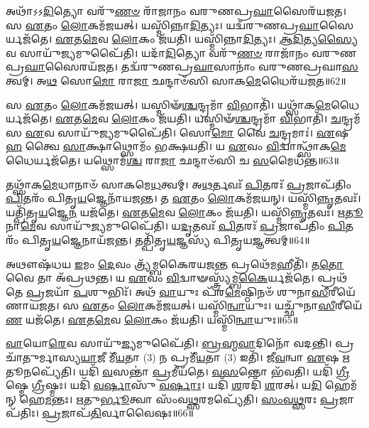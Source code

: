 𑌅𑌥𑌾᳴𑌽𑌽\-\ul{𑌦𑌿}\-𑌤𑍍𑌯𑍋 𑌵𑌰𑍁᳴\-\ul{𑌣}\-\-\ul{𑍞} 𑌰𑌾᳴𑌜𑌾𑌨𑌂 𑌵𑌰𑍁𑌣𑌪𑍍𑌰\-\ul{𑌘𑌾}\-𑌸𑍈𑌰᳴𑌯𑌜𑌤।
𑌸 \ul{𑌏}\-𑌤𑌂 \ul{𑌲𑍋}\-𑌕𑌮᳴𑌜𑌯𑌤𑍍।
𑌯𑌸𑍍𑌮𑌿᳴𑌨𑍍𑌨𑌾\-\ul{𑌦𑌿}\-𑌤𑍍𑌯𑌃।
𑌯𑌦𑍍𑌵᳴𑌰𑍁𑌣𑌪𑍍𑌰\-\ul{𑌘𑌾}\-𑌸𑍈𑌰𑍍𑌯𑌜᳴𑌤𑍇।
\-\ul{𑌏}\-𑌤\-\ul{𑌮𑍇}\-𑌵 \ul{𑌲𑍋}\-𑌕𑌂 𑌜᳴𑌯𑌤𑌿।
𑌯𑌸𑍍𑌮𑌿᳴𑌨𑍍𑌨𑌾\-\ul{𑌦𑌿}\-𑌤𑍍𑌯𑌃।
\-\ul{𑌆}\-\-\ul{𑌦𑌿}\-𑌤𑍍𑌯\-\ul{𑌸𑍍𑌯𑍈}\-𑌵 𑌸𑌾𑌯𑍁᳴\-\ul{𑌜𑍍𑌯}\-𑌮𑍁𑌪𑍈᳴𑌤𑌿।
𑌯𑌦𑌾᳴\-\ul{𑌦𑌿}\-𑌤𑍍𑌯𑍋 𑌵𑌰𑍁᳴\-\ul{𑌣}\-\-\ul{𑍞} 𑌰𑌾𑌜𑌾᳴𑌨𑌂 𑌵𑌰𑍁𑌣𑌪𑍍𑌰\-\ul{𑌘𑌾}\-𑌸𑍈\-𑌰𑌯᳴𑌜𑌤।
𑌤𑌦𑍍𑌵᳴𑌰𑍁𑌣𑌪𑍍𑌰\-\ul{𑌘𑌾}\-𑌸𑌾𑌨𑌾𑌂॑ 𑌵𑌰𑍁𑌣𑌪𑍍𑌰𑌘𑌾\-\ul{𑌸}\-𑌤𑍍𑌵𑌮𑍍।
𑌅\-\ul{𑌥} 𑌸𑍋\-\ul{𑌮𑍋} 𑌰𑌾\-\ul{𑌜𑌾} 𑌛𑌨𑍍𑌦𑌾𑍞᳴𑌸𑌿 𑌸𑌾𑌕\-\ul{𑌮𑍇}\-𑌧𑍈𑌰᳴𑌯𑌜𑌤॥62॥

𑌸 \ul{𑌏}\-𑌤𑌂 \ul{𑌲𑍋}\-𑌕𑌮᳴𑌜𑌯𑌤𑍍।
𑌯𑌸𑍍𑌮𑌿𑍟᳴\-\ul{𑌶𑍍𑌚}\-𑌨𑍍𑌦𑍍𑌰𑌮𑌾᳴ \ul{𑌵𑌿}\-𑌭𑌾𑌤𑌿᳴।
𑌯𑌥𑍍𑌸𑌾᳴𑌕\-\ul{𑌮𑍇}\-𑌧𑍈𑌰𑍍𑌯𑌜᳴𑌤𑍇।
\-\ul{𑌏}\-𑌤\-\ul{𑌮𑍇}\-𑌵 \ul{𑌲𑍋}\-𑌕𑌂 𑌜᳴𑌯𑌤𑌿।
𑌯𑌸𑍍𑌮𑌿𑍟᳴\-\ul{𑌶𑍍𑌚}\-𑌨𑍍𑌦𑍍𑌰𑌮𑌾᳴ \ul{𑌵𑌿}\-𑌭𑌾𑌤𑌿᳴।
\-\ul{𑌚}\-𑌨𑍍𑌦𑍍𑌰𑌮᳴𑌸 \ul{𑌏}\-𑌵 𑌸𑌾𑌯𑍁᳴\-\ul{𑌜𑍍𑌯}\-𑌮𑍁𑌪𑍈᳴𑌤𑌿।
𑌸𑍋\-\ul{𑌮𑍋} 𑌵𑍈 \ul{𑌚}\-𑌨𑍍𑌦𑍍𑌰𑌮𑌾𑌃॑।
\-\ul{𑌏}\-𑌷 \ul{𑌹} 𑌤𑍍𑌵𑍈 \ul{𑌸𑌾}\-𑌕𑍍𑌷𑌾𑌥𑍍𑌸𑍋𑌮𑌂᳴ 𑌭𑌕𑍍𑌷𑌯𑌤𑌿।
𑌯 \ul{𑌏}\-𑌵𑌂 \ul{𑌵𑌿}\-𑌦𑍍𑌵𑌾𑌨𑍍𑌥𑍍𑌸𑌾᳴𑌕\-\ul{𑌮𑍇}\-𑌧𑍈𑌰𑍍𑌯𑌜᳴𑌤𑍇।
𑌯𑌥𑍍𑌸𑍋𑌮᳴\-\ul{𑌶𑍍𑌚} 𑌰𑌾\-\ul{𑌜𑌾} 𑌛𑌨𑍍𑌦𑌾𑍞᳴𑌸𑌿 𑌚 \ul{𑌸}\-𑌮𑍈𑌧᳴𑌨𑍍𑌤॥63॥

𑌤𑌥𑍍𑌸𑌾᳴𑌕\-\ul{𑌮𑍇}\-𑌧𑌾𑌨𑌾𑍞᳴ 𑌸𑌾𑌕𑌮𑍇\-\ul{𑌧}\-𑌤𑍍𑌵𑌮𑍍।
𑌅\-\ul{𑌥}\-𑌰𑍍𑌤𑌵𑌃᳴ \ul{𑌪𑌿}\-𑌤𑌰𑌃᳴ \ul{𑌪𑍍𑌰}\-𑌜𑌾𑌪᳴𑌤𑌿𑌂 \ul{𑌪𑌿}\-𑌤𑌰𑌂᳴ 𑌪𑌿𑌤𑍃\-\ul{𑌯}\-𑌜𑍍𑌞𑍇𑌨𑌾᳴𑌯𑌜𑌨𑍍𑌤।
𑌤 \ul{𑌏}\-𑌤𑌂 \ul{𑌲𑍋}\-𑌕𑌮᳴𑌜𑌯𑌨𑍍।
𑌯𑌸𑍍𑌮𑌿᳴\-\ul{𑌨𑍍𑌨𑍃}\-𑌤𑌵𑌃᳴।
𑌯𑌤𑍍𑌪𑌿᳴𑌤𑍃\-\ul{𑌯}\-𑌜𑍍𑌞𑍇\-\ul{𑌨} 𑌯𑌜᳴𑌤𑍇।
\-\ul{𑌏}\-𑌤\-\ul{𑌮𑍇}\-𑌵 \ul{𑌲𑍋}\-𑌕𑌂 𑌜᳴𑌯𑌤𑌿।
𑌯𑌸𑍍𑌮𑌿᳴\-\ul{𑌨𑍍𑌨𑍃}\-𑌤𑌵𑌃᳴।
\-\ul{𑌋}\-\-\ul{𑌤𑍂}\-𑌨𑌾\-\ul{𑌮𑍇}\-𑌵 𑌸𑌾𑌯𑍁᳴\-\ul{𑌜𑍍𑌯}\-𑌮𑍁𑌪𑍈᳴𑌤𑌿।
𑌯\-\ul{𑌦𑍃}\-𑌤𑌵𑌃᳴ \ul{𑌪𑌿}\-𑌤𑌰𑌃᳴ \ul{𑌪𑍍𑌰}\-𑌜𑌾𑌪᳴𑌤𑌿𑌂 \ul{𑌪𑌿}\-𑌤𑌰𑌂᳴ 𑌪𑌿𑌤𑍃\-\ul{𑌯}\-𑌜𑍍𑌞𑍇𑌨𑌾𑌯᳴𑌜𑌨𑍍𑌤।
𑌤𑌤𑍍𑌪𑌿᳴𑌤𑍃\-\ul{𑌯}\-𑌜𑍍𑌞𑌸𑍍𑌯᳴ 𑌪𑌿𑌤𑍃𑌯\-\ul{𑌜𑍍𑌞}\-𑌤𑍍𑌵𑌮𑍍॥64॥

𑌅𑌥𑍗𑌷᳴𑌧𑌯 \ul{𑌇}\-𑌮𑌂 \ul{𑌦𑍇}\-𑌵𑌂 𑌤𑍍𑌰𑍍𑌯᳴𑌮𑍍𑌬𑌕𑍈𑌰𑌯𑌜\-\ul{𑌨𑍍𑌤} 𑌪𑍍𑌰𑌥𑍇᳴\-\ul{𑌮}\-𑌹𑍀𑌤𑌿᳴।
𑌤\-\ul{𑌤𑍋} 𑌵𑍈 𑌤𑌾 𑌅᳴𑌪𑍍𑌰𑌥𑌨𑍍𑌤।
𑌯 \ul{𑌏}\-𑌵𑌂 \ul{𑌵𑌿}\-𑌦𑍍𑌵𑌾𑍟𑌸𑍍𑌤𑍍𑌰𑍍𑌯᳴𑌮𑍍𑌬\-\ul{𑌕𑍈}\-𑌰𑍍𑌯𑌜᳴𑌤𑍇।
𑌪𑍍𑌰𑌥᳴𑌤𑍇 \ul{𑌪𑍍𑌰}\-𑌜𑌯𑌾᳴ \ul{𑌪}\-𑌶𑍁𑌭𑌿𑌃᳴।
𑌅𑌥᳴ \ul{𑌵𑌾}\-𑌯𑍁𑌃 𑌪᳴𑌰\-\ul{𑌮𑍇}\-𑌷𑍍𑌠𑌿𑌨𑍞᳴ 𑌶𑍁𑌨𑌾\-\ul{𑌸𑍀}\-𑌰𑍀𑌯𑍇᳴𑌣𑌾𑌯𑌜𑌤।
𑌸 \ul{𑌏}\-𑌤𑌂 \ul{𑌲𑍋}\-𑌕𑌮᳴𑌜𑌯𑌤𑍍।
𑌯𑌸𑍍𑌮𑌿᳴\-\ul{𑌨𑍍𑌵𑌾}\-𑌯𑍁𑌃।
𑌯𑌚𑍍𑌛𑍁᳴𑌨𑌾\-\ul{𑌸𑍀}\-𑌰𑍀𑌯𑍇᳴\-\ul{𑌣} 𑌯𑌜᳴𑌤𑍇।
\-\ul{𑌏}\-𑌤\-\ul{𑌮𑍇}\-𑌵 \ul{𑌲𑍋}\-𑌕𑌂 𑌜᳴𑌯𑌤𑌿।
𑌯𑌸𑍍𑌮𑌿᳴\-\ul{𑌨𑍍𑌵𑌾}\-𑌯𑍁𑌃॥65॥

\-\ul{𑌵𑌾}\-𑌯𑍋\-\ul{𑌰𑍇}\-𑌵 𑌸𑌾𑌯𑍁᳴\-\ul{𑌜𑍍𑌯}\-𑌮𑍁𑌪𑍈᳴𑌤𑌿।
\-\ul{𑌬𑍍𑌰}\-\-\ul{𑌹𑍍𑌮}\-\-\ul{𑌵𑌾}\-𑌦𑌿𑌨𑍋᳴ 𑌵𑌦𑌨𑍍𑌤𑌿।
𑌪𑍍𑌰 𑌚𑌾᳴𑌤𑍁𑌰𑍍𑌮𑌾𑌸𑍍𑌯\-\ul{𑌯𑌾}\-𑌜𑍀 𑌮𑍀᳴\-\ul{𑌯}\-𑌤𑌾 (3) 𑌨 𑌪𑍍𑌰𑌮𑍀᳴\-\ul{𑌯}\-𑌤𑌾 (3) 𑌇𑌤𑌿᳴।
𑌜𑍀\-\ul{𑌵}\-𑌨𑍍𑌵𑌾 \ul{𑌏}\-𑌷 \ul{𑌋}\-𑌤𑍂𑌨𑌪𑍍𑌯𑍇᳴𑌤𑌿।
𑌯𑌦𑌿᳴ \ul{𑌵}\-𑌸𑌨𑍍𑌤𑌾॑ \ul{𑌪𑍍𑌰}\-𑌮𑍀𑌯᳴𑌤𑍇।
\-\ul{𑌵}\-\-\ul{𑌸}\-𑌨𑍍𑌤𑍋 𑌭᳴𑌵𑌤𑌿।
𑌯𑌦𑌿᳴ \ul{𑌗𑍍𑌰𑍀}\-𑌷𑍍𑌮𑍇 \ul{𑌗𑍍𑌰𑍀}\-𑌷𑍍𑌮𑌃।
𑌯𑌦𑌿᳴ \ul{𑌵}\-\-\ul{𑌰𑍍}\-𑌷𑌾𑌸𑍁᳴ \ul{𑌵}\-\-\ul{𑌰𑍍}\-𑌷𑌾𑌃।
𑌯𑌦𑌿᳴ \ul{𑌶}\-𑌰𑌦𑌿᳴ \ul{𑌶}\-𑌰𑌤𑍍।
𑌯\-\ul{𑌦𑌿} 𑌹𑍇𑌮᳴𑌨𑍍 𑌹𑍇\-\ul{𑌮}\-𑌨𑍍𑌤𑌃।
\-\ul{𑌋}\-𑌤𑍁\-\ul{𑌰𑍍𑌭𑍂}\-𑌤𑍍𑌵𑌾 𑌸𑌂᳴𑌵\-\ul{𑌥𑍍𑌸}\-𑌰𑌮𑌪𑍍𑌯𑍇᳴𑌤𑌿।
\-\ul{𑌸𑌂}\-\-\ul{𑌵}\-\-\ul{𑌥𑍍𑌸}\-𑌰𑌃 \ul{𑌪𑍍𑌰}\-𑌜𑌾\-𑌪᳴𑌤𑌿𑌃।
\-\ul{𑌪𑍍𑌰}\-𑌜𑌾𑌪᳴\-\ul{𑌤𑌿}\-𑌰𑍍𑌵𑌾𑌵𑍈𑌷𑌃॥66॥






